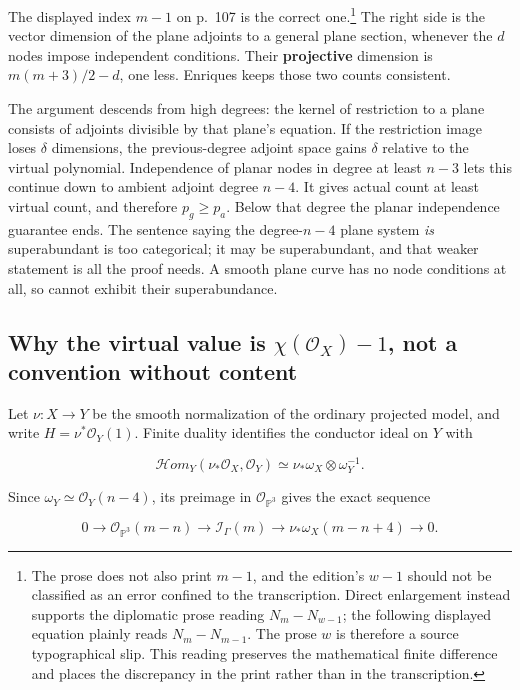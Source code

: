 The displayed index \(m-1\) on p.~107 is the correct one.\footnote{The prose does not also print \(m-1\), and the edition's \(w-1\) should not be classified as an error confined to the transcription. Direct enlargement instead supports the diplomatic prose reading \(N_m-N_{w-1}\); the following displayed equation plainly reads \(N_m-N_{m-1}\). The prose \(w\) is therefore a source typographical slip. This reading preserves the mathematical finite difference and places the discrepancy in the print rather than in the transcription.} The right side is the vector dimension of the plane adjoints to a general plane section, whenever the \(d\) nodes impose independent conditions. Their \textbf{projective} dimension is \(m(m+3)/2-d\), one less. Enriques keeps those two counts consistent.

The argument descends from high degrees: the kernel of restriction to a plane consists of adjoints divisible by that plane's equation. If the restriction image loses \(\delta\) dimensions, the previous-degree adjoint space gains \(\delta\) relative to the virtual polynomial. Independence of planar nodes in degree at least \(n-3\) lets this continue down to ambient adjoint degree \(n-4\). It gives actual count at least virtual count, and therefore \(p_g\geq p_a\). Below that degree the planar independence guarantee ends. The sentence saying the degree-\(n-4\) plane system \emph{is} superabundant is too categorical; it may be superabundant, and that weaker statement is all the proof needs. A smooth plane curve has no node conditions at all, so cannot exhibit their superabundance.

\subsection{\texorpdfstring{Why the virtual value is \(\chi(\mathcal O_X)-1\), not a convention without content}{Why the virtual value is \textbackslash chi(\textbackslash mathcal O\_X)-1, not a convention without content}}

Let \(\nu:X\to Y\) be the smooth normalization of the ordinary projected model, and write \(H=\nu^*\mathcal O_Y(1)\). Finite duality identifies the conductor ideal on \(Y\) with

\[
 \mathcal{H}om_Y(\nu_*\mathcal O_X,\mathcal O_Y)
 \simeq\nu_*\omega_X\otimes\omega_Y^{-1}.
\]

Since \(\omega_Y\simeq\mathcal O_Y(n-4)\), its preimage in \(\mathcal O_{\mathbb P^3}\) gives the exact sequence

\[
 0\longrightarrow\mathcal O_{\mathbb P^3}(m-n)
 \longrightarrow\mathcal I_\Gamma(m)
 \longrightarrow\nu_*\omega_X(m-n+4)
 \longrightarrow0. \tag{IV.3.1}
\]

